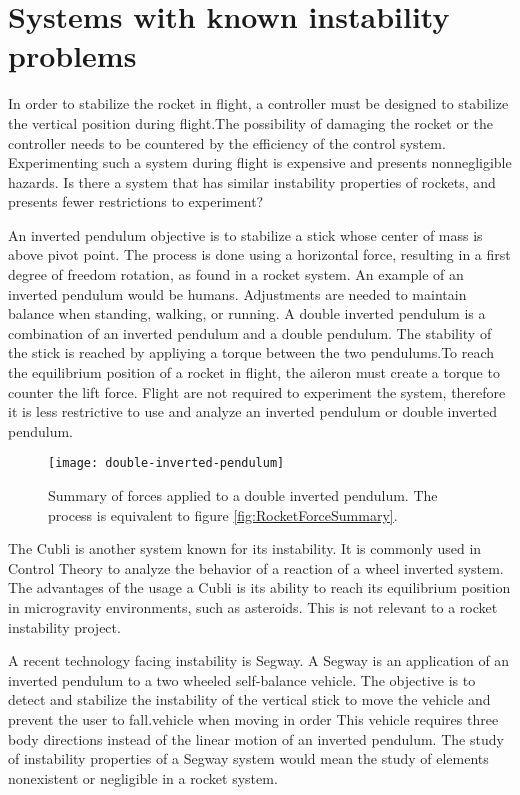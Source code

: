 \section{Systems with known instability problems}
\graphicspath{{figures/"Preanalysis&Requirement"/SimilarSystems/}}
In order to stabilize the rocket in flight, a controller must be designed to stabilize the vertical position during flight.The possibility of damaging the rocket or the controller needs to be countered by the efficiency of the control system. Experimenting such a system during flight is expensive and presents nonnegligible hazards.
Is there a system that has similar instability properties of rockets, and presents fewer restrictions to experiment?

An inverted pendulum objective is to stabilize a stick whose center of mass is above pivot point. The process is done using a horizontal force, resulting in a first degree of freedom rotation, as found in a rocket system. An example of an inverted pendulum would be humans. Adjustments are needed to maintain balance when standing, walking, or running. 
A double inverted pendulum is a combination of an inverted pendulum and a double pendulum. The stability of the stick is reached by appliying a torque between the two pendulums.To reach the equilibrium position of a rocket in flight, the aileron must create a torque to counter the lift force. Flight are not required to experiment the system, therefore it is less restrictive to use and analyze an inverted pendulum or double inverted pendulum. 

\begin{figure}[htbp]
	\centering
	\texttt{[image: double-inverted-pendulum]}
	\caption{Summary of forces applied to a double inverted pendulum. The process is equivalent to figure  \vref{fig:RocketForceSummary}.}
	\label{fig:InvertedPendulum}
\end{figure}



The Cubli is another system known for its instability. It is commonly used in Control Theory to analyze the behavior of a reaction of a wheel inverted system. The advantages of the usage a Cubli is its ability to reach its equilibrium position in microgravity environments, such as asteroids. This is not relevant to a rocket instability project.

A recent technology facing instability is Segway. A Segway is an application of an inverted pendulum to a two wheeled self-balance vehicle. The objective is to detect and stabilize the instability of the vertical stick to move the vehicle and prevent the user to fall.vehicle when moving in order This vehicle requires three body directions instead of the linear motion of an inverted pendulum. The study of instability properties of a Segway system would mean the study of elements nonexistent or negligible in a rocket system.


